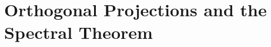 \section{Orthogonal Projections and the Spectral Theorem}\label{sec:6.6}

\exercisesection

\begin{ex}\label{ex:6.6.10}

\end{ex}
